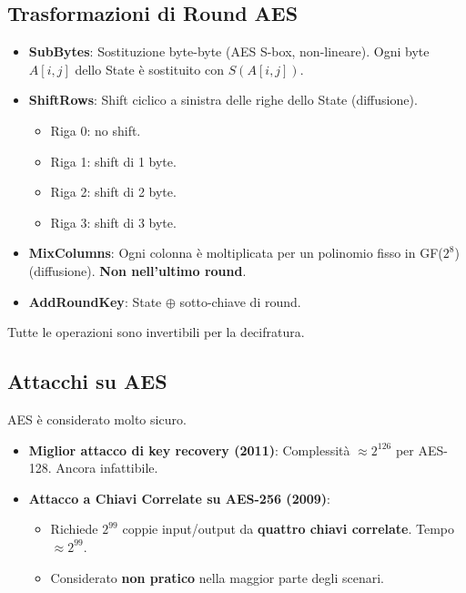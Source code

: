\documentclass{article}
\begin{document}
\subsection{Trasformazioni di Round AES}
\begin{itemize}
    \item \textbf{SubBytes}: Sostituzione byte-byte (AES S-box, non-lineare).
    Ogni byte $A[i,j]$ dello State è sostituito con $S(A[i,j])$.
    \item \textbf{ShiftRows}: Shift ciclico a sinistra delle righe dello State (diffusione).
    \begin{itemize}
        \item Riga 0: no shift.
        \item Riga 1: shift di 1 byte.
        \item Riga 2: shift di 2 byte.
        \item Riga 3: shift di 3 byte.
    \end{itemize}
    \item \textbf{MixColumns}: Ogni colonna è moltiplicata per un polinomio fisso in GF($2^8$) (diffusione). \textbf{Non nell'ultimo round}.
    \item \textbf{AddRoundKey}: State $\oplus$ sotto-chiave di round.
\end{itemize}
Tutte le operazioni sono invertibili per la decifratura.

\subsection{Attacchi su AES}
AES è considerato molto sicuro.
\begin{itemize}
    \item \textbf{Miglior attacco di key recovery (2011)}: Complessità $\approx 2^{126}$ per AES-128. Ancora infattibile.
    \item \textbf{Attacco a Chiavi Correlate su AES-256 (2009)}:
    \begin{itemize}
        \item Richiede $2^{99}$ coppie input/output da \textbf{quattro chiavi correlate}. Tempo $\approx 2^{99}$.
        \item Considerato \textbf{non pratico} nella maggior parte degli scenari.
    \end{itemize}
\end{itemize}
\end{document}
